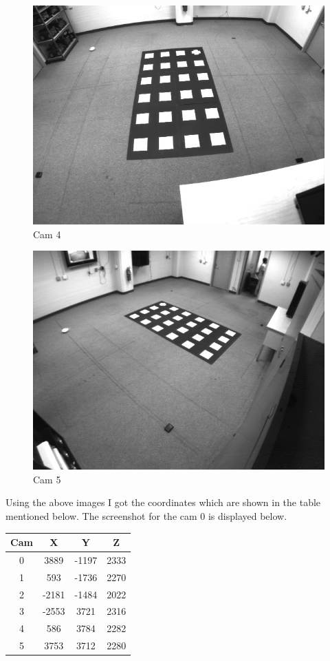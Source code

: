\documentclass{article}
\begin{document}
\begin{enumerate}
\newpage
\begin{figure}[!htb]
    \centering
  		\includegraphics[scale=0.6]{CalImage_4.png}
  		\caption{Cam 4}
  		\label{Fig5}
 \end{figure}
\newpage
 \begin{figure}[!htb]
    \centering
  		\includegraphics[scale=0.6]{CalImage_5.png}
  		\caption{Cam 5}
  		\label{Fig6}
 \end{figure}

Using the above images I got the coordinates which are shown in the table mentioned below. The screenshot for the cam 0 is displayed below. 
\begin{center}
 \begin{tabular}{||c c c c||} 
 \hline
 Cam & X & Y & Z \\ [0.5ex] 
 \hline\hline
 0 & 3889 & -1197 & 2333 \\ 
 \hline
 1 & 593 & -1736 & 2270 \\
 \hline
 2 & -2181 & -1484 & 2022 \\
 \hline
 3 & -2553 & 3721 & 2316 \\
 \hline
 4 & 586 & 3784 & 2282 \\  
 \hline
 5 & 3753 & 3712 & 2280 \\ [1ex] 
 \hline
\end{tabular}
\end{center}


\end{enumerate}
\end{document}
